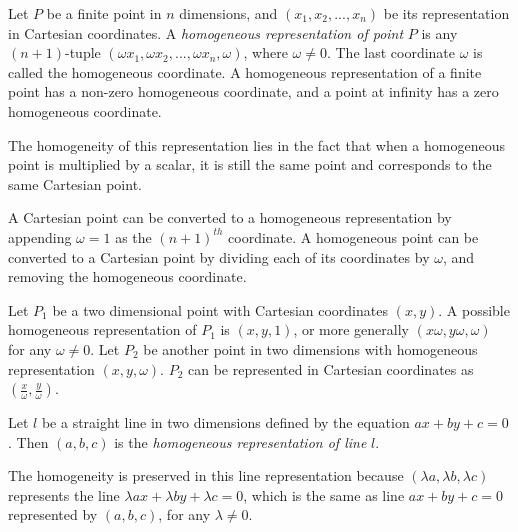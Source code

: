 \documentclass[11pt, oneside, reqno]{book}
\begin{document}
%	



\begin{definition}
	\label{def:hpoint}
	Let $P$ be a finite point in $n$ dimensions, and $(x_1, x_2, ..., x_n)$ be its representation in Cartesian coordinates. A \textit{homogeneous representation of point} $P$ is any $(n+1)$-tuple $(\omega x_1, \omega x_2, ..., \omega x_n, \omega)$, where $\omega \not=0$. The last coordinate $\omega$ is called the homogeneous coordinate. A homogeneous representation of a finite point has a non-zero homogeneous coordinate, and a point at infinity has a zero homogeneous coordinate.
\end{definition}

The homogeneity of this representation lies in the fact that when a homogeneous point is multiplied by a scalar, it is still the same point and corresponds to the same Cartesian point.

A Cartesian point can be converted to a homogeneous representation by appending $\omega=1$ as the $(n+1)^{th}$ coordinate. A homogeneous point can be converted to a Cartesian point by dividing each of its coordinates by $\omega$, and removing the homogeneous coordinate.

\begin{example}
	\label{ex:cartHomo}
	Let $P_1$ be a two dimensional point with Cartesian coordinates $(x,y)$. A possible homogeneous representation of $P_1$ is $(x,y,1)$, or more generally $(x\omega, y\omega, \omega)$ for any $\omega \not= 0$. Let $P_2$ be another point in two dimensions with homogeneous representation $(x,y,\omega)$. $P_2$ can be represented in Cartesian coordinates as $\left(\frac{x}{\omega}, \frac{y}{\omega}\right)$.
\end{example}

\begin{definition}
\label{def:hline}
Let $l$ be a straight line in two dimensions defined by the equation $ax+by+c = 0$. Then $(a,b,c)$ is the \textit{homogeneous representation of line} $l$.
\end{definition}

The homogeneity is preserved in this line representation because $(\lambda a, \lambda b, \lambda c)$ represents the line $\lambda ax+ \lambda by+ \lambda c = 0$, which is the same as line $ax+by+c = 0$ represented by $(a, b, c)$, for any $\lambda \not=0$.
\end{document}
